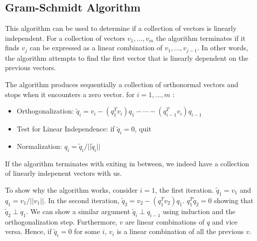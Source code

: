 \documentclass[../../linear_algebra.tex]{subfiles}
\begin{document}
\subsection{Gram-Schmidt Algorithm}
This algorithm can be used to determine if a collection of vectors is linearly independent. For a collection of vectors $v_{1}, \ldots, v_{m}$ the algorithm terminates if it finds $v_{j}$ can be expressed as a linear combination of $v_{1}, \ldots, v_{j-1}$. In other words, the algorithm attempts to find the first vector that is linearly dependent on the previous vectors.\newline

The algorithm produces sequentially a collection of orthonormal vectors and stops when it encounters a zero vector.\newline
for $i = 1, \ldots, m$ :
\begin{itemize}
    \item Orthogonalization: $\tilde{q}_{i} = v_{i} - (q_{1}^{T}v_{i})q_{1} - \cdots - (q_{i-1}^{T}v_{i})q_{i-1}$
    \item Test for Linear Independence: if $\tilde{q}_{i} = 0$, quit
    \item Normalization: $q_{i} = \tilde{q}_{i}/ \lvert\lvert \tilde{q}_{i} \rvert\rvert$
\end{itemize}
If the algorithm terminates with exiting in between, we indeed have a collection of linearly indepenent vectors with us.\newline

To show why the algorithm works, consider $i = 1$, the first iteration. $\tilde{q}_{1} = v_{1}$ and $q_{1} = v_{1}/\lvert\lvert v_{1} \rvert\rvert$. In the second iteration, $\tilde{q}_{2} = v_{2} - (q_{1}^{T}v_{2})q_{1}$. $q_{1}^{T}\tilde{q}_{2} = 0$ showing that $\tilde{q}_{2} \perp q_{1}$. We can show a similar argument $\tilde{q}_{i} \perp q_{i-1}$ using induction and the orthogonalization step. Furthermore, $v$ are linear combinations of $q$ and vice versa. Hence, if $\tilde{q}_{i} = 0$ for some $i$, $v_{i}$ is a linear combination of all the previous $v$.
\end{document}
